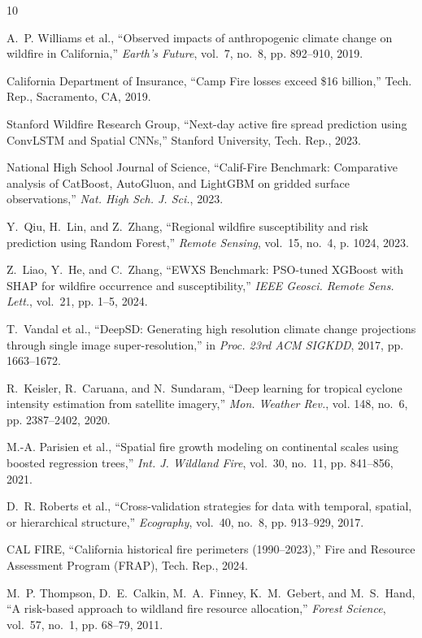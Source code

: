 \documentclass[journal]{IEEEtran}
\begin{document}

\begin{thebibliography}{10}

A.~P. Williams et al., ``Observed impacts of anthropogenic climate change on wildfire in California,'' \emph{Earth's Future}, vol.~7, no.~8, pp. 892--910, 2019.

California Department of Insurance, ``Camp Fire losses exceed \$16 billion,'' Tech. Rep., Sacramento, CA, 2019.

Stanford Wildfire Research Group, ``Next-day active fire spread prediction using ConvLSTM and Spatial CNNs,'' Stanford University, Tech. Rep., 2023.

National High School Journal of Science, ``Calif-Fire Benchmark: Comparative analysis of CatBoost, AutoGluon, and LightGBM on gridded surface observations,'' \emph{Nat. High Sch. J. Sci.}, 2023.

Y.~Qiu, H.~Lin, and Z.~Zhang, ``Regional wildfire susceptibility and risk prediction using Random Forest,'' \emph{Remote Sensing}, vol.~15, no.~4, p. 1024, 2023.

Z.~Liao, Y.~He, and C.~Zhang, ``EWXS Benchmark: PSO-tuned XGBoost with SHAP for wildfire occurrence and susceptibility,'' \emph{IEEE Geosci. Remote Sens. Lett.}, vol.~21, pp. 1--5, 2024.

T.~Vandal et al., ``DeepSD: Generating high resolution climate change projections through single image super-resolution,'' in \emph{Proc. 23rd ACM SIGKDD}, 2017, pp. 1663--1672.

R.~Keisler, R.~Caruana, and N.~Sundaram, ``Deep learning for tropical cyclone intensity estimation from satellite imagery,'' \emph{Mon. Weather Rev.}, vol. 148, no.~6, pp. 2387--2402, 2020.

M.-A. Parisien et al., ``Spatial fire growth modeling on continental scales using boosted regression trees,'' \emph{Int. J. Wildland Fire}, vol.~30, no.~11, pp. 841--856, 2021.

D.~R. Roberts et al., ``Cross-validation strategies for data with temporal, spatial, or hierarchical structure,'' \emph{Ecography}, vol.~40, no.~8, pp. 913--929, 2017.

CAL FIRE, ``California historical fire perimeters (1990--2023),'' Fire and Resource Assessment Program (FRAP), Tech. Rep., 2024.

M.~P. Thompson, D.~E.~Calkin, M.~A.~Finney, K.~M.~Gebert, and M.~S.~Hand, ``A risk-based approach to wildland fire resource allocation,'' \emph{Forest Science}, vol.~57, no.~1, pp. 68--79, 2011.

\end{thebibliography}
\end{document}
